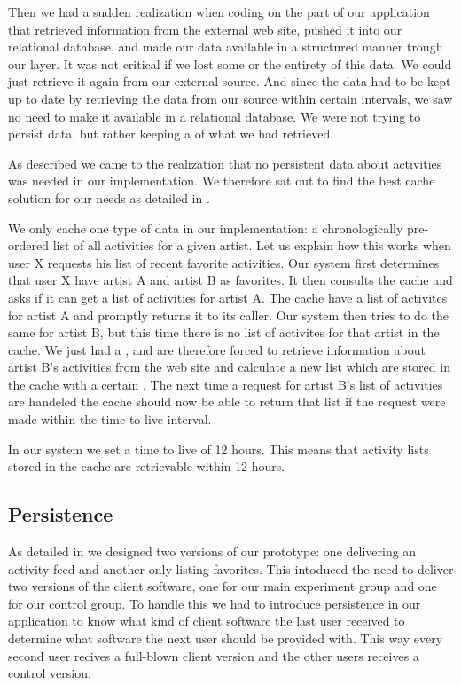 Then we had a sudden realization when coding on the part of our application
that retrieved information from the external \urort{} web site, pushed it into
our relational database, and made our data available in a structured manner
trough our  layer. It was not critical if we lost some or the
entirety of this data. We could just retrieve it again from our external
source. And since the data had to be kept up to date by retrieving the data
from our source within certain intervals, we saw no need to make it available
in a relational database. We were not trying to persist data, but rather
keeping a %
of what we had retrieved.

As described we came to the realization that no persistent data
about activities was needed in our implementation.
We therefore sat out to find the best cache solution for our needs as detailed
in .

We only cache one type of data in our implementation:
a chronologically pre-ordered list of all activities for a given artist.
Let us explain how this works
when user X requests his list of recent favorite activities. Our system
first determines that user X have artist A and artist B as
favorites. It then consults the cache and asks if it can get a list of
activities for artist A. The cache have a list of activites for artist A and
promptly returns it to its caller. Our system then tries to do the same for
artist B, but this time there is no list of activites for that artist in the
cache. We just had a , and are therefore forced to retrieve
information about artist B's activities from the \urort{} web site and
calculate a new list which are stored in the cache with a certain
. The next time a request for artist B's list of activities
are handeled the cache should now be able to return that list if the request
were made within the time to live interval.

In our system we set a time to live of 12 hours. This means that activity
lists stored in the cache are retrievable within 12 hours.

\subsection{Persistence}

As detailed in
we designed two versions of our prototype: one delivering an activity
feed and another only listing favorites. This intoduced the need to deliver
two versions of the client software, one for our main experiment group and one
for our control group. To handle this we had to introduce persistence in our
application to know what kind of client software the last user received to
determine what software the next user should be provided with. This way every
second user recives a full-blown client version and the other users receives a
control version.

